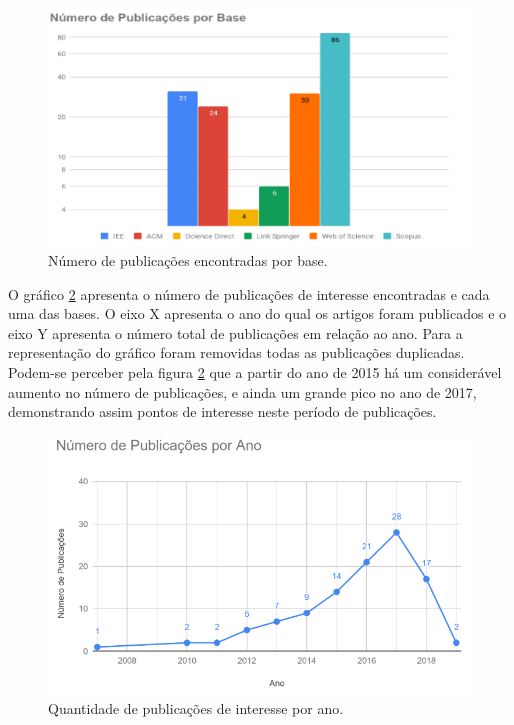 \documentclass[ti,table]{texufpel} %
\begin{document}
\begin{figure}[ht]
	\centering
	\includegraphics[width=.9\textwidth]{imagens/GrafBarraPubAno.png}
	\caption{Número de publicações encontradas por base.}
	\label{fig:GrafBarraPubAno}
\end{figure}


O gráfico \ref{fig:grafPublicaAno} apresenta o número de publicações de interesse encontradas e cada uma das bases. O eixo X apresenta o ano do qual os artigos foram publicados e o eixo Y apresenta o número total de publicações em relação ao ano. Para a representação do gráfico foram removidas todas as publicações duplicadas. Podem-se perceber pela figura \ref{fig:grafPublicaAno} que a partir do ano de 2015 há um considerável aumento no número de publicações, e ainda um grande pico no ano de 2017, demonstrando assim pontos de interesse neste período de publicações.

\begin{figure}[ht]
	\centering
	\includegraphics[width=.9\textwidth]{imagens/grafPublicaAno.png}
	\caption{Quantidade de publicações de interesse por ano.}
	\label{fig:grafPublicaAno}
\end{figure}
\end{document}
